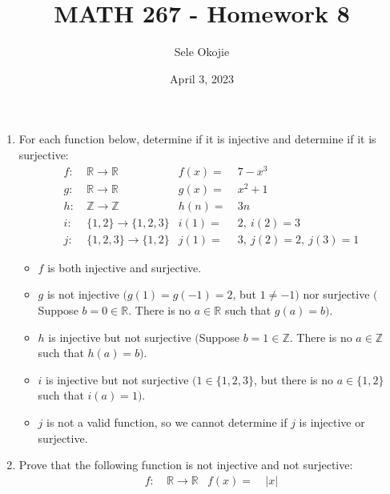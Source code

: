 \documentclass{article}
\title{MATH 267 - Homework 8}
\author{Sele Okojie}
\date{April 3, 2023}
\begin{document}
    \maketitle

    \begin{enumerate}

	\item For each function below, determine if it is injective and determine if it is surjective:
		  \begin{align*}
			f : & \ \mathbb{R} \rightarrow \mathbb{R} & f(x) = & \ 7 - x^3 \\
			g : & \ \mathbb{R} \rightarrow \mathbb{R} & g(x) = & \ x^2 + 1 \\
			h : & \ \mathbb{Z} \rightarrow \mathbb{Z} & h(n) = & \ 3n \\
			i : & \ \{ 1, 2 \} \rightarrow \{ 1, 2, 3 \} & i(1) = & \ 2, \ i(2) = 3 \\
			j : & \ \{ 1, 2, 3 \} \rightarrow \{ 1, 2 \} & j(1) = & \ 3, \ j(2) = 2, \ j(3) = 1
		  \end{align*}

            \begin{itemize}
                \item $f$ is both injective and surjective.
                \item $g$ is not injective $\big( g(1) = g(\minus 1) = 2 $, but $1\ne\minus1\big)$ nor surjective $\big($Suppose $b = 0\in\mathbb{R}$. There is no $a\in\mathbb{R}$ such that $g(a) = b\big)$.
                \item $h$ is injective but not surjective $\big($Suppose $b = 1\in\mathbb{Z}$. There is no $a\in\mathbb{Z}$ such that $h(a) = b\big)$.
                \item $i$ is injective but not surjective $\big(1\in\{ 1, 2, 3 \}$, but there is no $a\in\{ 1, 2 \}$ such that $i(a) = 1\big)$.
                \item $j$ is not a valid function, so we cannot determine if $j$ is injective or surjective.
            \end{itemize}
        
	\item Prove that the following function is not injective and not surjective:
		  \begin{align*}
			f : & \ \mathbb{R} \rightarrow \mathbb{R} & f(x) = & \ |x|
		  \end{align*}


\end{enumerate}
\end{document}
